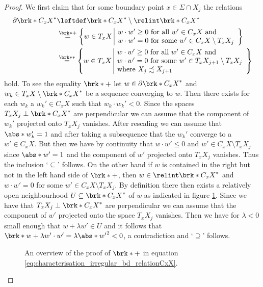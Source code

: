 \begin{proof}
  We first claim that for some boundary point $x\in\Sigma\cap X_j$ the relations
  \begin{align}
    \begin{aligned}
    \partial\brk*{C_xX}^* &\leftdef\brk*{C_xX}^*\setminus\relint\brk*{C_xX}^*\\
    &\stackrel{\brk*{+}}{=}\left\{w\in T_xX\;\begin{array}{|l}
      w\cdot w'\geq0\text{ for all }w'\in C_xX\text{ and }\\
      w\cdot w'=0\text{ for some }w'\in C_xX\setminus T_xX_{j}
    \end{array}\right\}\\
    &\stackrel{\brk*{*}}{=}\left\{w\in T_xX\;\begin{array}{|l}
      w\cdot w'\geq0\text{ for all }w'\in C_xX\text{ and }\\
      w\cdot w'=0\text{ for some }w'\in T_xX_{j+1}\setminus T_xX_{j}\\
      \text{where }X_{j}\precsim X_{j+1}
    \end{array}\right\}
    \end{aligned}
    \label{eq:characterisation_irregular_bd_relationCxX}
  \end{align}
  hold.
  To see the equality $\brk*{+}$ let $w\in\partial \brk*{C_xX}^*$
  and $w_k\in T_xX\setminus\brk*{C_xX}^*$ be a sequence converging to $w$. Then there
  exists for each $w_k$ a $w_k'\in C_xX$ such that $w_k\cdot w_k'<0$.
  Since the spaces $T_xX_j\perp\brk*{C_xX}^*$ are perpendicular we can assume that the component
  of $w_k'$ projected onto $T_xX_j$ vanishes.
  After rescaling we can assume that $\abs*{w_k'}=1$
  and after taking a subsequence that the $w_k'$ converge to a $w'\in C_xX$. But then we have by continuity that
  $w\cdot w'\leq 0$ and $w'\in C_xX\setminus T_xX_j$ since $\abs*{w'}=1$ and the component of $w'$ projected onto $T_xX_j$ vanishes.
  Thus the inclusion `$\subseteq$' follows.
  On the other hand if $w$ is contained in the right but not in the left hand side of $\brk*{+}$, then $w\in\relint\brk*{C_xX}^*$
  and $w\cdot w'=0$ for some $w'\in C_xX\setminus T_xX_j$.
  By definition there then exists a relatively open neighbourhood $U\subseteq \brk*{C_xX}^*$ of $w$
  as indicated in figure \ref{fi:irregularCPs_X12}.
  Since we have that $T_xX_j\perp \brk*{C_xX}^*$ are perpendicular we can assume that the component of $w'$ projected onto the space $T_xX_j$
  vanishes.
  Then we have for $\lambda<0$ small enough that $w+\lambda w'\in U$
  and it follows that $\brk*{w+\lambda w'}\cdot w'=\lambda\abs*{w'}^2<0$, a contradiction
  and `$\supseteq$' follows.
  \begin{figure}
    \centering
    
    \caption{An overview of the proof of $\brk*{+}$ in equation \eqref{eq:characterisation_irregular_bd_relationCxX}.}
    \label{fi:irregularCPs_X12}
  \end{figure}


\end{proof}

